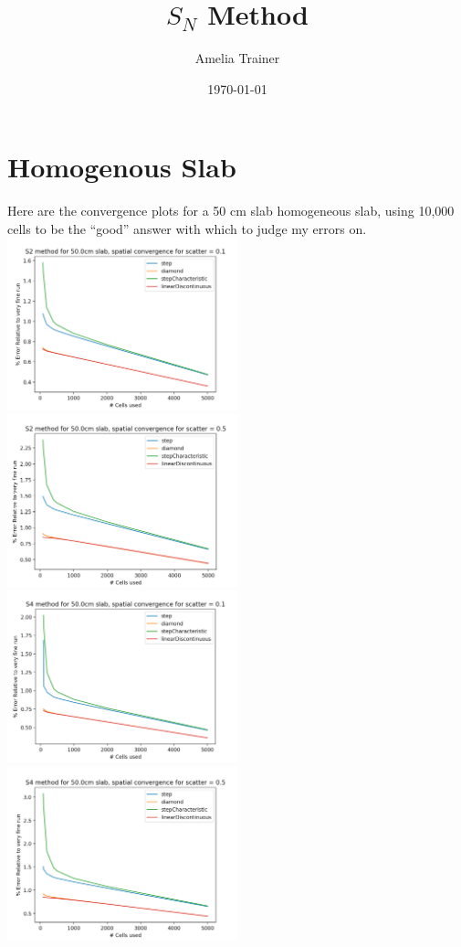 \documentclass[a4paper]{article}
\title{$S_N$ Method}
\author{Amelia Trainer}
\date{\today}
\begin{document}
\maketitle


\section*{Homogenous Slab}
Here are the convergence plots for a 50 cm slab homogeneous slab, using 10,000 cells to be the ``good'' answer with which to judge my errors on.\\
\includegraphics[width=0.5\textwidth]{f2}
\includegraphics[width=0.5\textwidth]{f3}\\

\includegraphics[width=0.5\textwidth]{f1}
\includegraphics[width=0.5\textwidth]{f4}\\
\end{document}
